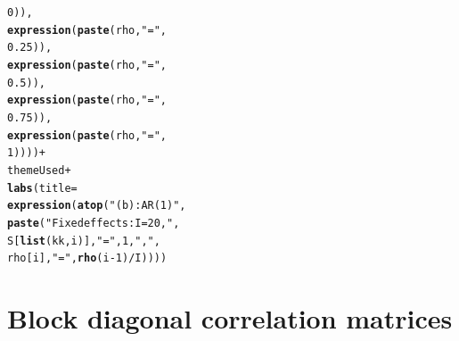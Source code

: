 \documentclass{article}\usepackage[]{graphicx}\usepackage[]{color}
\makeatletter
\newcommand{\hlnum}[1]{\textcolor[rgb]{0.686,0.059,0.569}{#1}}%
\newcommand{\hlstr}[1]{\textcolor[rgb]{0.192,0.494,0.8}{#1}}%
\newcommand{\hlopt}[1]{\textcolor[rgb]{0,0,0}{#1}}%
\newcommand{\hlstd}[1]{\textcolor[rgb]{0.345,0.345,0.345}{#1}}%
\newcommand{\hlkwc}[1]{\textcolor[rgb]{0.333,0.667,0.333}{#1}}%
\newcommand{\hlkwd}[1]{\textcolor[rgb]{0.737,0.353,0.396}{\textbf{#1}}}%
\newenvironment{kframe}{%
 \def\at@end@of@kframe{}%
 \ifinner\ifhmode%
  \def\at@end@of@kframe{\end{minipage}}%
  \begin{minipage}{\columnwidth}%
 \fi\fi%
 \def\FrameCommand##1{\hskip\@totalleftmargin \hskip-\fboxsep
 \colorbox{shadecolor}{##1}\hskip-\fboxsep
     \hskip-\linewidth \hskip-\@totalleftmargin \hskip\columnwidth}%
 \MakeFramed {\advance\hsize-\width
   \@totalleftmargin\z@ \linewidth\hsize
   \@setminipage}}%
 {\par\unskip\endMakeFramed%
 \at@end@of@kframe}
\newenvironment{knitrout}{}{} %
\makeatother
\begin{document}
\begin{knitrout}
\begin{kframe}
\begin{alltt}
                                            \hlnum{0}\hlstd{)),}
                           \hlkwd{expression}\hlstd{(}\hlkwd{paste}\hlstd{(rho,} \hlstr{"="}\hlstd{,}
                                            \hlnum{0.25}\hlstd{)),}
                           \hlkwd{expression}\hlstd{(}\hlkwd{paste}\hlstd{(rho,} \hlstr{"="}\hlstd{,}
                                            \hlnum{0.5}\hlstd{)),}
                           \hlkwd{expression}\hlstd{(}\hlkwd{paste}\hlstd{(rho,} \hlstr{"="}\hlstd{,}
                                            \hlnum{0.75}\hlstd{)),}
                           \hlkwd{expression}\hlstd{(}\hlkwd{paste}\hlstd{(rho,} \hlstr{"="}\hlstd{,}
                                            \hlnum{1}\hlstd{))))} \hlopt{+}
  \hlstd{themeUsed}\hlopt{+}
  \hlkwd{labs}\hlstd{(}\hlkwc{title}\hlstd{=}
         \hlkwd{expression}\hlstd{(}\hlkwd{atop}\hlstd{(}\hlstr{"(b): AR(1)"}\hlstd{,}
                         \hlkwd{paste}\hlstd{(}\hlstr{"Fixed effects: I = 20, "}\hlstd{,}
                               \hlstd{S[}\hlkwd{list}\hlstd{(kk,i)],} \hlstr{" = "}\hlstd{,} \hlnum{1}\hlstd{,} \hlstr{", "}\hlstd{,}
                               \hlstd{rho[i],} \hlstr{" = "}\hlstd{,} \hlkwd{rho}\hlstd{(i}\hlopt{-}\hlnum{1}\hlstd{)}\hlopt{/}\hlstd{I))))}
\end{alltt}
\end{kframe}
\end{knitrout}

\section{Block diagonal correlation matrices}
\end{document}
